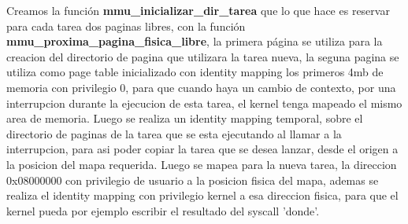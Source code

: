 Creamos la función \textbf{mmu_inicializar_dir_tarea} que lo que hace es reservar para cada tarea dos paginas libres, con la función \textbf{mmu_proxima_pagina_fisica_libre}, la primera página se utiliza para la creacion del directorio de pagina que utilizara la tarea nueva, la seguna pagina se utiliza como page table inicializado con identity mapping los primeros 4mb de memoria con privilegio 0, para que cuando haya un cambio de contexto, por una interrupcion durante la ejecucion de esta tarea, el kernel tenga mapeado el mismo area de memoria.
Luego se realiza un identity mapping temporal,  sobre el directorio de paginas de la tarea que se esta ejecutando al llamar a la interrupcion, para asi poder copiar la tarea que se desea lanzar, desde el origen a la posicion del mapa requerida.
Luego se mapea para la nueva tarea, la direccion 0x08000000 con privilegio de usuario a la posicion fisica del mapa, ademas se realiza el identity mapping con privilegio kernel a esa direccion fisica, para que el kernel pueda por ejemplo escribir el resultado del syscall 'donde'.